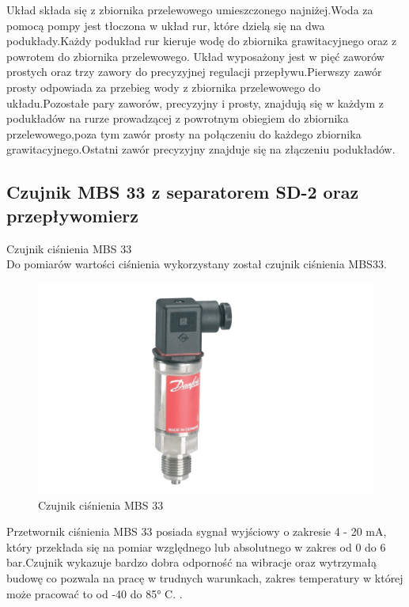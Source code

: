 Układ składa się z zbiornika przelewowego umieszczonego najniżej.Woda za pomocą pompy jest tłoczona w układ rur, które dzielą się na dwa podukłady.Każdy podukład rur kieruje wodę do zbiornika grawitacyjnego oraz z powrotem do zbiornika przelewowego. Układ wyposażony jest w pięć zaworów prostych oraz trzy zawory do precyzyjnej regulacji przepływu.Pierwszy zawór prosty odpowiada za przebieg wody z zbiornika przelewowego do układu.Pozostałe pary zaworów, precyzyjny i prosty, znajdują się  w każdym z podukładów na rurze prowadzącej z powrotnym obiegiem do zbiornika przelewowego,poza tym zawór prosty na połączeniu do każdego zbiornika grawitacyjnego.Ostatni zawór precyzyjny znajduje się na złączeniu podukładów.
\newpage
\subsection{Czujnik MBS 33 z separatorem SD-2 oraz przepływomierz}
\selectfont
Czujnik ciśnienia MBS 33\\
\selectfont
Do pomiarów wartości ciśnienia wykorzystany został czujnik ciśnienia MBS33.

\begin{figure}[h]
\centering
\includegraphics[scale=0.45]{Zdjecia/Stanowiska/4_Pompa/MBS_33.jpg}
\caption{Czujnik ciśnienia MBS 33}
\end{figure}

Przetwornik ciśnienia MBS 33 posiada sygnał wyjściowy o zakresie  4 - 20 mA, który przekłada się na pomiar względnego lub absolutnego w zakres od 0 do 6 bar.Czujnik wykazuje bardzo dobra odporność na wibracje oraz wytrzymałą budowę co pozwala na pracę w trudnych warunkach, zakres temperatury w której może pracować to od -40 do 85° C.
\cite{diduce:MBS33}.\\

